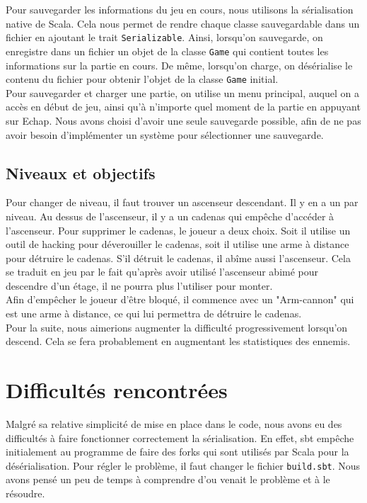 \documentclass[10pt,a4paper]{article}
\begin{document}
Pour sauvegarder les informations du jeu en cours, nous utilisons la sérialisation native de Scala. Cela nous permet de rendre chaque classe sauvegardable dans un fichier en ajoutant le trait \texttt{Serializable}. Ainsi, lorsqu'on sauvegarde, on enregistre dans un fichier un objet de la classe \texttt{Game} qui contient toutes les informations sur la partie en cours. De même, lorsqu'on charge, on désérialise le contenu du fichier pour obtenir l'objet de la classe \texttt{Game} initial.\\
Pour sauvegarder et charger une partie, on utilise un menu principal, auquel on a accès en début de jeu, ainsi qu'à n'importe quel moment de la partie en appuyant sur Echap. Nous avons choisi d'avoir une seule sauvegarde possible, afin de ne pas avoir besoin d'implémenter un système pour sélectionner une sauvegarde.\\

\subsection{Niveaux et objectifs}

Pour changer de niveau, il faut trouver un ascenseur descendant. Il y en a un par niveau. Au dessus de l'ascenseur, il y a un cadenas qui empêche d'accéder à l'ascenseur. Pour supprimer le cadenas, le joueur a deux choix. Soit il utilise un outil de hacking pour déverouiller le cadenas, soit il utilise une arme à distance pour détruire le cadenas. S'il détruit le cadenas, il abîme aussi l'ascenseur. Cela se traduit en jeu par le fait qu'après avoir utilisé l'ascenseur abimé pour descendre d'un étage, il ne pourra plus l'utiliser pour monter.\\
Afin d'emp\^echer le joueur d'\^etre bloqué, il commence avec un "Arm-cannon" qui est une arme à distance, ce qui lui permettra de détruire le cadenas.\\
Pour la suite, nous aimerions augmenter la difficulté progressivement lorsqu'on descend. Cela se fera probablement en augmentant les statistiques des ennemis.

\section{Difficultés rencontrées}

Malgré sa relative simplicité de mise en place dans le code, nous avons eu des difficultés à faire fonctionner correctement la sérialisation. En effet, sbt empêche initialement au programme de faire des forks qui sont utilisés par Scala pour la désérialisation. Pour régler le problème, il faut changer le fichier \texttt{build.sbt}. Nous avons pensé un peu de temps à comprendre d'ou venait le problème et à le résoudre.\\
\end{document}
